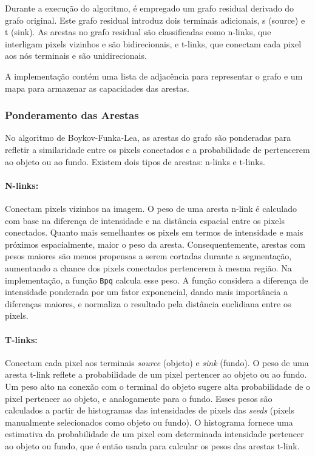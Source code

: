 \documentclass[12pt]{article}
\begin{document}
Durante a execução do algoritmo, é empregado um grafo residual derivado do grafo original. Este grafo residual introduz dois terminais adicionais, s (source) e t (sink). As arestas no grafo residual são classificadas como n-links, que interligam pixels vizinhos e são bidirecionais, e t-links, que conectam cada pixel aos nós terminais e são unidirecionais.

A implementação contém uma lista de adjacência para representar o grafo e um mapa para armazenar as capacidades das arestas. 

\subsubsection{Ponderamento das Arestas}

No algoritmo de Boykov-Funka-Lea, as arestas do grafo são ponderadas para refletir a similaridade entre os pixels conectados e a probabilidade de pertencerem ao objeto ou ao fundo. Existem dois tipos de arestas: n-links e t-links.

\paragraph{N-links:} Conectam pixels vizinhos na imagem. O peso de uma aresta n-link é calculado com base na diferença de intensidade e na distância espacial entre os pixels conectados. Quanto mais semelhantes os pixels em termos de intensidade e mais próximos espacialmente, maior o peso da aresta. Consequentemente, arestas com pesos maiores são menos propensas a serem cortadas durante a segmentação, aumentando a chance dos pixels conectados pertencerem à mesma região. Na implementação, a função \texttt{Bpq} calcula esse peso. A função considera a diferença de intensidade ponderada por um fator exponencial, dando mais importância a diferenças maiores, e normaliza o resultado pela distância euclidiana entre os pixels.

\paragraph{T-links:} Conectam cada pixel aos terminais \textit{source} (objeto) e \textit{sink} (fundo). O peso de uma aresta t-link reflete a probabilidade de um pixel pertencer ao objeto ou ao fundo. Um peso alto na conexão com o terminal do objeto sugere alta probabilidade de o pixel pertencer ao objeto, e analogamente para o fundo. Esses pesos são calculados a partir de histogramas das intensidades de pixels das \textit{seeds} (pixels manualmente selecionados como objeto ou fundo). O histograma fornece uma estimativa da probabilidade de um pixel com determinada intensidade pertencer ao objeto ou fundo, que é então usada para calcular os pesos das arestas t-link.
\end{document}
